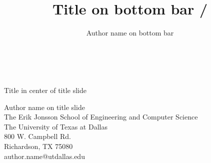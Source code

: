 \title{Title on bottom bar \hspace*{0.25in} \insertframenumber/\inserttotalframenumber}
\author{Author name on bottom bar}
\begin{frame}
\frametitle{ \ }
\begin{center}
\huge Title in center of title slide
\end{center}
\begin{center}
{\large
{Author name on title slide}}\\
{\footnotesize
The Erik Jonsson School of Engineering and Computer Science\\
The University of Texas at Dallas\\
800 W. Campbell Rd. \\
Richardson, TX 75080\\
author.name@utdallas.edu}
\end{center}
\end{frame}